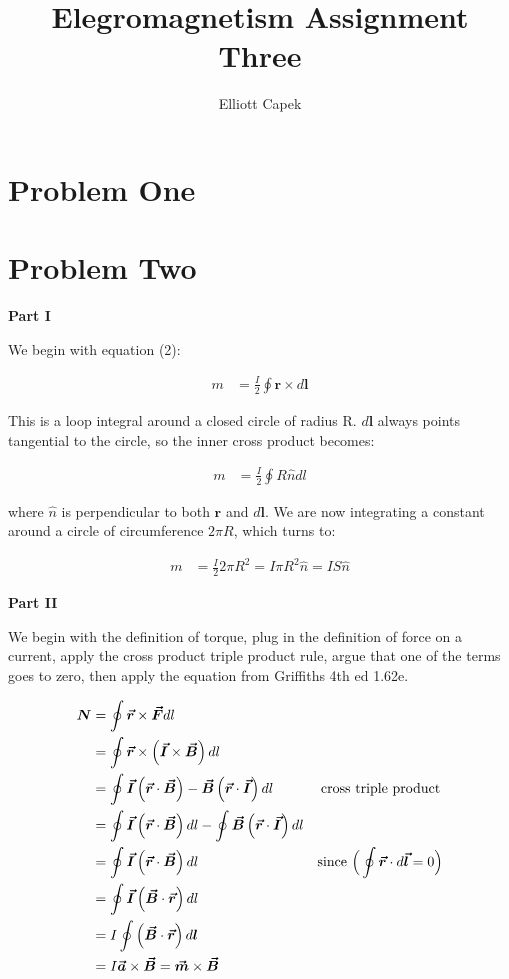 \documentclass[10pt]{article} %
\title{Elegromagnetism Assignment Three}
\author{Elliott Capek}
\newcommand{\bv}[1]{\boldsymbol{\vec{#1}}}
\begin{document}
\maketitle{}

\section{Problem One}

\section{Problem Two}
\textbf{Part I}

We begin with equation (2):

\begin{align*}
  m &= \frac{I}{2}\oint \boldsymbol{r} \times d\boldsymbol{l}
\end{align*}

This is a loop integral around a closed circle of radius R. $d\boldsymbol{l}$ always points tangential to the circle, so the inner
cross product becomes:

\begin{align*}
  m &= \frac{I}{2}\oint R\hat{n} dl
\end{align*}

where $\hat{n}$ is perpendicular to both $\boldsymbol{r}$ and $d\boldsymbol{l}$. We are now integrating a constant around a circle of circumference $2\pi R$, which turns to:

\begin{align*}
  m &= \frac{I}{2}2\pi R^2 = I\pi R^2\hat{n} = IS\hat{n}
\end{align*}

\textbf{Part II}

We begin with the definition of torque, plug in the definition of force on a current, apply the cross product triple product rule,
argue that one of the terms goes to zero, then apply the equation from Griffiths 4th ed 1.62e.

\begin{align*}
  \boldsymbol{N} &= \oint \bv{r} \times \bv{F}dl\\
  &= \oint \bv{r} \times \left(\bv{I} \times \bv{B}\right)dl\\
  &= \oint \bv{I}\left(\bv{r} \cdot \bv{B}\right) - \bv{B}\left(\bv{r} \cdot \bv{I}\right)dl \hspace{1.2cm}\mbox{cross triple product}\\
  &= \oint \bv{I}\left(\bv{r} \cdot \bv{B}\right)dl - \oint\bv{B}\left(\bv{r} \cdot \bv{I}\right)dl\\
  &= \oint \bv{I}\left(\bv{r} \cdot \bv{B}\right)dl \hspace{3cm}\mbox{since }\Big(\oint \bv{r} \cdot d\bv{l} = 0\Big)\\
  &= \oint \bv{I}\left(\bv{B} \cdot \bv{r}\right)dl\\
  &= I\oint \left(\bv{B} \cdot \bv{r}\right)d\boldsymbol{l}\\
  &= I\bv{a} \times \bv{B} = \bv{m} \times \bv{B}\\
\end{align*}
\end{document}
